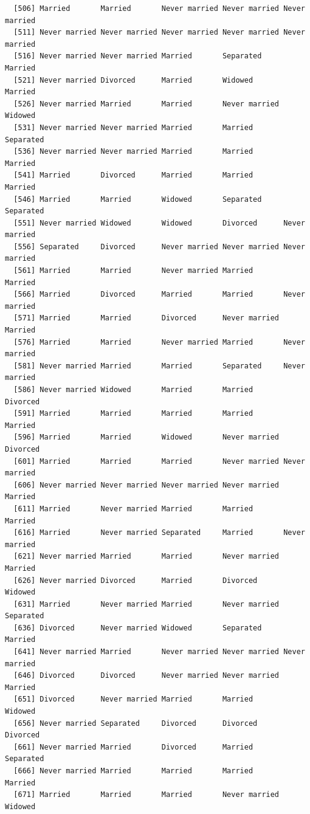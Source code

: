 \documentclass[
  letterpaper,
  DIV=11,
  numbers=noendperiod,
  oneside]{scrartcl}
\begin{document}
\begin{verbatim}
  [506] Married       Married       Never married Never married Never married
  [511] Never married Never married Never married Never married Never married
  [516] Never married Never married Married       Separated     Married      
  [521] Never married Divorced      Married       Widowed       Married      
  [526] Never married Married       Married       Never married Widowed      
  [531] Never married Never married Married       Married       Separated    
  [536] Never married Never married Married       Married       Married      
  [541] Married       Divorced      Married       Married       Married      
  [546] Married       Married       Widowed       Separated     Separated    
  [551] Never married Widowed       Widowed       Divorced      Never married
  [556] Separated     Divorced      Never married Never married Never married
  [561] Married       Married       Never married Married       Married      
  [566] Married       Divorced      Married       Married       Never married
  [571] Married       Married       Divorced      Never married Married      
  [576] Married       Married       Never married Married       Never married
  [581] Never married Married       Married       Separated     Never married
  [586] Never married Widowed       Married       Married       Divorced     
  [591] Married       Married       Married       Married       Married      
  [596] Married       Married       Widowed       Never married Divorced     
  [601] Married       Married       Married       Never married Never married
  [606] Never married Never married Never married Never married Married      
  [611] Married       Never married Married       Married       Married      
  [616] Married       Never married Separated     Married       Never married
  [621] Never married Married       Married       Never married Married      
  [626] Never married Divorced      Married       Divorced      Widowed      
  [631] Married       Never married Married       Never married Separated    
  [636] Divorced      Never married Widowed       Separated     Married      
  [641] Never married Married       Never married Never married Never married
  [646] Divorced      Divorced      Never married Never married Married      
  [651] Divorced      Never married Married       Married       Widowed      
  [656] Never married Separated     Divorced      Divorced      Divorced     
  [661] Never married Married       Divorced      Married       Separated    
  [666] Never married Married       Married       Married       Married      
  [671] Married       Married       Married       Never married Widowed      

\end{verbatim}
\end{document}
